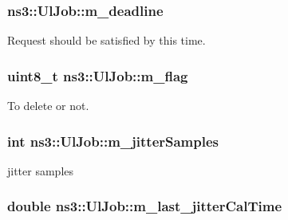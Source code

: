 \subsubsection[{\texorpdfstring{m\+\_\+deadline}{m_deadline}}]{ ns3\+::\+Ul\+Job\+::m\+\_\+deadline\hspace{0.3cm}{\ttfamily [private]}}\hypertarget{classns3_1_1UlJob_a8b8537377082a92f0280dad63011ab73}{}\label{classns3_1_1UlJob_a8b8537377082a92f0280dad63011ab73}


Request should be satisfied by this time. 

\subsubsection[{\texorpdfstring{m\+\_\+flag}{m_flag}}]{\setlength{\rightskip}{0pt plus 5cm}uint8\+\_\+t ns3\+::\+Ul\+Job\+::m\+\_\+flag\hspace{0.3cm}{\ttfamily [private]}}\hypertarget{classns3_1_1UlJob_a8c83246fd0f1ac301a9c961f505513ec}{}\label{classns3_1_1UlJob_a8c83246fd0f1ac301a9c961f505513ec}


To delete or not. 

\subsubsection[{\texorpdfstring{m\+\_\+jitter\+Samples}{m_jitterSamples}}]{\setlength{\rightskip}{0pt plus 5cm}int ns3\+::\+Ul\+Job\+::m\+\_\+jitter\+Samples\hspace{0.3cm}{\ttfamily [private]}}\hypertarget{classns3_1_1UlJob_a7fe33c932cd4e956479a53e9672016cb}{}\label{classns3_1_1UlJob_a7fe33c932cd4e956479a53e9672016cb}


jitter samples 

\subsubsection[{\texorpdfstring{m\+\_\+last\+\_\+jitter\+Cal\+Time}{m_last_jitterCalTime}}]{\setlength{\rightskip}{0pt plus 5cm}double ns3\+::\+Ul\+Job\+::m\+\_\+last\+\_\+jitter\+Cal\+Time\hspace{0.3cm}{\ttfamily [private]}}\hypertarget{classns3_1_1UlJob_af58ad6d3cf3dd156ec730e397b68d28c}{}\label{classns3_1_1UlJob_af58ad6d3cf3dd156ec730e397b68d28c}


